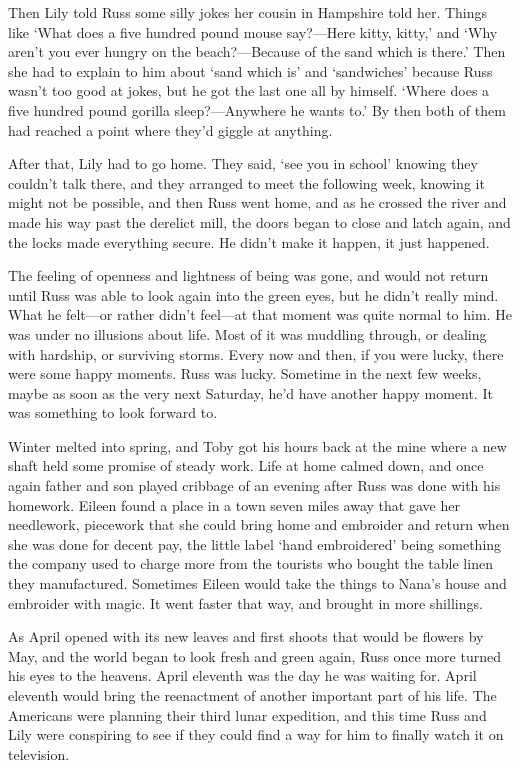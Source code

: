 Then Lily told Russ some silly jokes her cousin in Hampshire told her. Things like `What does a five hundred pound mouse say?—Here kitty, kitty,' and `Why aren't you ever hungry on the beach?—Because of the sand which is there.' Then she had to explain to him about `sand which is' and `sandwiches' because Russ wasn't too good at jokes, but he got the last one all by himself. `Where does a five hundred pound gorilla sleep?—Anywhere he wants to.' By then both of them had reached a point where they'd giggle at anything.

After that, Lily had to go home. They said, `see you in school' knowing they couldn't talk there, and they arranged to meet the following week, knowing it might not be possible, and then Russ went home, and as he crossed the river and made his way past the derelict mill, the doors began to close and latch again, and the locks made everything secure. He didn't make it happen, it just happened.

The feeling of openness and lightness of being was gone, and would not return until Russ was able to look again into the green eyes, but he didn't really mind. What he felt—or rather didn't feel—at that moment was quite normal to him. He was under no illusions about life. Most of it was muddling through, or dealing with hardship, or surviving storms. Every now and then, if you were lucky, there were some happy moments. Russ was lucky. Sometime in the next few weeks, maybe as soon as the very next Saturday, he'd have another happy moment. It was something to look forward to.

Winter melted into spring, and Toby got his hours back at the mine where a new shaft held some promise of steady work. Life at home calmed down, and once again father and son played cribbage of an evening after Russ was done with his homework. Eileen found a place in a town seven miles away that gave her needlework, piecework that she could bring home and embroider and return when she was done for decent pay, the little label `hand embroidered' being something the company used to charge more from the tourists who bought the table linen they manufactured. Sometimes Eileen would take the things to Nana's house and embroider with magic. It went faster that way, and brought in more shillings.

As April opened with its new leaves and first shoots that would be flowers by May, and the world began to look fresh and green again, Russ once more turned his eyes to the heavens. April eleventh was the day he was waiting for. April eleventh would bring the reenactment of another important part of his life. The Americans were planning their third lunar expedition, and this time Russ and Lily were conspiring to see if they could find a way for him to finally watch it on television.

